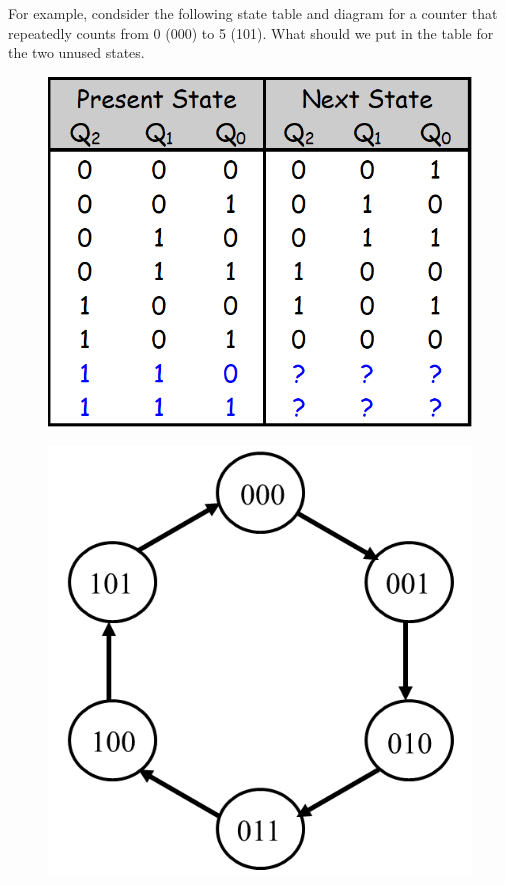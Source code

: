 For example, condsider the following state table and diagram for a counter that repeatedly counts from 0 (000) to 5 (101). What should we put in the table for the two unused states.
\begin{figure}[H]
  \centering
  \begin{minipage}{0.49\linewidth}
      \centering
      \includegraphics[width=\linewidth]{img/unused-state-table.png}
      \label{fig:unused-state-table}
  \end{minipage}\hfill
  \begin{minipage}{0.49\linewidth}
      \centering
      \includegraphics[width=\linewidth]{img/unused-state-diagram.png}
      \label{fig:unused-state-diagram.png}
  \end{minipage}
\end{figure}

